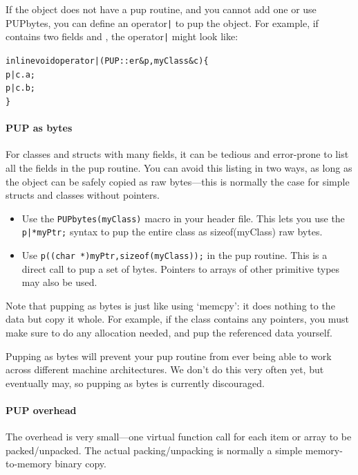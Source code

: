 If the object does not have a pup routine, and you cannot add one or use 
PUPbytes, you can define an operator\verb.|. to pup the object.
For example, if  contains two fields  and , the 
operator\verb.|. might look like:

\begin{alltt}
  inline void operator|(PUP::er &p,myClass &c) \{
    p|c.a;
    p|c.b;
  \}
\end{alltt}


\paragraph{PUP as bytes}
\label{sec:pupbytes}

For classes and structs with many fields, it can be tedious and 
error-prone to list all the fields in the pup routine.
You can avoid this listing in two ways, as long as the
object can be safely copied as raw bytes---this is normally 
the case for simple structs and classes without pointers.

\begin{itemize}
\item Use the \verb.PUPbytes(myClass). macro in your header file.
      This lets you use the \verb.p|*myPtr;. syntax 
      to pup the entire class as sizeof(myClass) raw bytes.

\item Use \verb.p((char *)myPtr,sizeof(myClass));. in the pup 
      routine.  This is a direct call to pup a set of bytes. 
      Pointers to arrays of other primitive types may also be used.
\end{itemize}

Note that pupping as bytes is just like using `memcpy': 
it does nothing to the data but copy it whole.
For example, if the class contains any pointers, you
must make sure to do any allocation needed, and
pup the referenced data yourself.

Pupping as bytes will prevent your pup routine from 
ever being able to work across different machine 
architectures.  We don't do this very often yet, but 
eventually may, so pupping as bytes is currently discouraged.



\paragraph{PUP overhead}
\label{sec:pupoverhead}

The  overhead is very small---one virtual function call
for each item or array to be packed/unpacked.  The actual packing/unpacking is
normally a simple memory-to-memory binary copy. 

